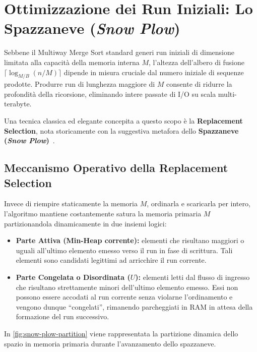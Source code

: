 \section{Ottimizzazione dei Run Iniziali: Lo Spazzaneve (\texorpdfstring{\emph{Snow Plow}}{Snow Plow})}
\label{sec:snow-plow}

Sebbene il Multiway Merge Sort standard generi run iniziali di dimensione limitata alla capacità della memoria interna $M$, l'altezza dell'albero di fusione $\lceil \log_{M/B}(n/M) \rceil$ dipende in misura cruciale dal numero iniziale di sequenze prodotte. Produrre run di lunghezza maggiore di $M$ consente di ridurre la profondità della ricorsione, eliminando intere passate di I/O su scala multi-terabyte.

Una tecnica classica ed elegante concepita a questo scopo è la \textbf{Replacement Selection}, nota storicamente con la suggestiva metafora dello \textbf{Spazzaneve (\emph{Snow Plow})}~\cite{knuth1997}.

\subsection{Meccanismo Operativo della Replacement Selection}
\label{subsec:snow-plow-mechanism}

Invece di riempire staticamente la memoria $M$, ordinarla e scaricarla per intero, l'algoritmo mantiene costantemente satura la memoria primaria $M$ partizionandola dinamicamente in due insiemi logici:
\begin{itemize}
  \item \textbf{Parte Attiva (Min-Heap corrente):} elementi che risultano maggiori o uguali all'ultimo elemento emesso verso il run in fase di scrittura. Tali elementi sono candidati legittimi ad arricchire il run corrente.
  \item \textbf{Parte Congelata o Disordinata ($U$):} elementi letti dal flusso di ingresso che risultano strettamente minori dell'ultimo elemento emesso. Essi non possono essere accodati al run corrente senza violarne l'ordinamento e vengono dunque ``congelati'', rimanendo parcheggiati in RAM in attesa della formazione del run successivo.
\end{itemize}

In \autoref{fig:snow-plow-partition} viene rappresentata la partizione dinamica dello spazio in memoria primaria durante l'avanzamento dello spazzaneve.

